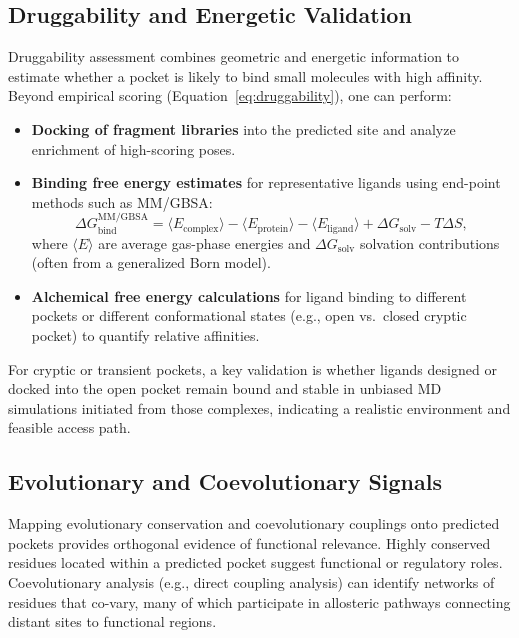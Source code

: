 \documentclass[12pt,a4paper]{article}
\begin{document}
\subsection{Druggability and Energetic Validation}

Druggability assessment combines geometric and energetic information to estimate whether a pocket is likely to bind small molecules with high affinity.\cite{CH5_Halgren2009,CH5_LeGuilloux2009} Beyond empirical scoring (Equation~\ref{eq:druggability}), one can perform:
\begin{itemize}
    \item \textbf{Docking of fragment libraries} into the predicted site and analyze enrichment of high-scoring poses.
    \item \textbf{Binding free energy estimates} for representative ligands using end-point methods such as MM/GBSA:
    \begin{equation}
    \Delta G_{\mathrm{bind}}^{\mathrm{MM/GBSA}} = \langle E_{\mathrm{complex}} \rangle - \langle E_{\mathrm{protein}} \rangle - \langle E_{\mathrm{ligand}} \rangle + \Delta G_{\mathrm{solv}} - T \Delta S,
    \end{equation}
    where \(\langle E \rangle\) are average gas-phase energies and \(\Delta G_{\mathrm{solv}}\) solvation contributions (often from a generalized Born model).
    \item \textbf{Alchemical free energy calculations} for ligand binding to different pockets or different conformational states (e.g., open vs.\ closed cryptic pocket) to quantify relative affinities.\cite{CH5_Kuzmanic2020,CH5_zhang2026decrypting}
\end{itemize}

For cryptic or transient pockets, a key validation is whether ligands designed or docked into the open pocket remain bound and stable in unbiased MD simulations initiated from those complexes, indicating a realistic environment and feasible access path.\cite{CH5_amaro2019will,CH5_Kuzmanic2020}

\subsection{Evolutionary and Coevolutionary Signals}

Mapping evolutionary conservation and coevolutionary couplings onto predicted pockets provides orthogonal evidence of functional relevance.\cite{CH5_ghersi2011beyond} Highly conserved residues located within a predicted pocket suggest functional or regulatory roles. Coevolutionary analysis (e.g., direct coupling analysis) can identify networks of residues that co-vary, many of which participate in allosteric pathways connecting distant sites to functional regions.
\end{document}

